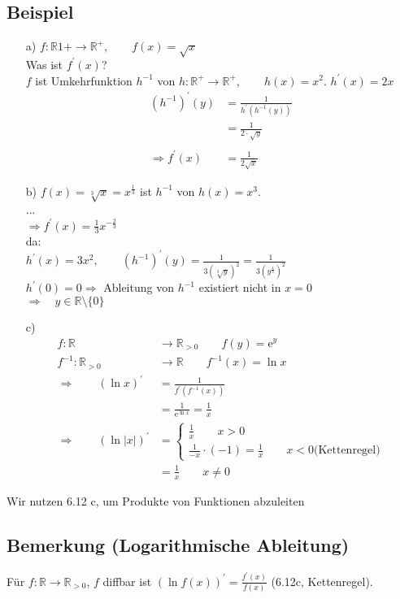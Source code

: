 \documentclass[12pt, titlepage]{article}
\newcommand{\R}{\mathds{R}}
\newcommand{\e}{\textrm{e}}
\renewcommand{\>}{\rightarrow}
\renewcommand{\*}{\cdot}
\begin{document}
	\subsection{Beispiel}
	\begin{itemize}
		\item[a)] $f\colon\R1+\>\R^+,\qquad f(x)=\sqrt{x}$\\
		Was ist $f^\prime(x)$?\\
		$f$ ist Umkehrfunktion $h^{-1}$ von $h\colon\R^+\>\R^+,\qquad h(x)=x^2$. $h^\prime(x)=2x$
		\begin{align*}
			(h^{-1})^\prime(y)&=\frac{1}{h^\prime(h^{-1}(y))}\\
			&=\frac{1}{2\*\sqrt{y}}\\
			&\\
			\Rightarrow f^\prime(x)&=\frac{1}{2\sqrt{x}}
		\end{align*}
		\item[b)] $f(x)=\sqrt[3]{x}=x^\frac{1}{3}$ ist $h^{-1}$ von $h(x)=x^3$.\\
		...\\
		$\Rightarrow f^\prime(x)=\frac{1}{3}x^{-\frac{2}{3}}$\\
		da:\\
		$h^\prime(x)=3x^2,\qquad (h^{-1})^\prime(y)=\frac{1}{3(\sqrt[3]{y})^2}=\frac{1}{3(y^\frac{1}{3})^2}$\\
		$h^\prime(0)=0\Rightarrow$ Ableitung von $h^{-1}$ existiert nicht in $x=0$\\
		$\Rightarrow \quad y\in\R\setminus\{0\}$
		\item[c)] \begin{align*}
			f\colon \R&\>\R_{>0}\qquad f(y)=\e^y\\
			f^{-1}\colon \R_{>0}&\>\R\qquad f^{-1}(x)=\ln x\\
			\Rightarrow\qquad (\ln x)^\prime&=\frac{1}{f^\prime(f^{-1}(x))}\\
			&=\frac{1}{\e^{\ln x}}=\frac{1}{x}\\
			\Rightarrow\qquad (\ln|x|)^\prime&=\begin{cases}\frac{1}{x}\qquad x>0\\
			\frac{1}{-x}\*(-1)=\frac{1}{x}\qquad x<0\textrm{(Kettenregel)}
			\end{cases}\\
			&=\frac{1}{x}\qquad x\neq 0
		\end{align*}
	\end{itemize}
	Wir nutzen 6.12 c, um Produkte von Funktionen abzuleiten
	\subsection{Bemerkung (Logarithmische Ableitung)}
	Für $f\colon\R\>\R_{>0}$, $f$ diffbar ist $(\ln f(x))^\prime=\frac{f^\prime(x)}{f(x)}$ (6.12c, Kettenregel).\\
\end{document}
